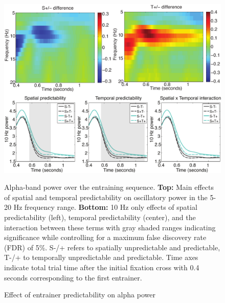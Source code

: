 \documentclass[dwyatte_dissertation.tex]{subfiles}
\begin{document}
\begin{figure}[h!]
\begin{center}
\includegraphics[width=160mm]{figs/chap_pleast/results_powphase_entrain_pow_montage.pdf}
\end{center}
\caption{Effect of entrainer predictability on alpha power}{Alpha-band power over the entraining sequence. \textbf{Top:} Main effects of spatial and temporal predictability on oscillatory power in the 5-20 Hz frequency range. \textbf{Bottom:} 10 Hz only effects of spatial predictability (left), temporal predictability (center), and the interaction between these terms with gray shaded ranges indicating significance while controlling for a maximum false discovery rate (FDR) of 5\%. S-/+ refers to spatially unpredictable and predictable, T-/+ to temporally unpredictable and predictable. Time axes indicate total trial time after the initial fixation cross with 0.4 seconds corresponding to the first entrainer.}
\label{fig:pleast_entrain_pow_10Hz}
\end{figure}
\end{document}
